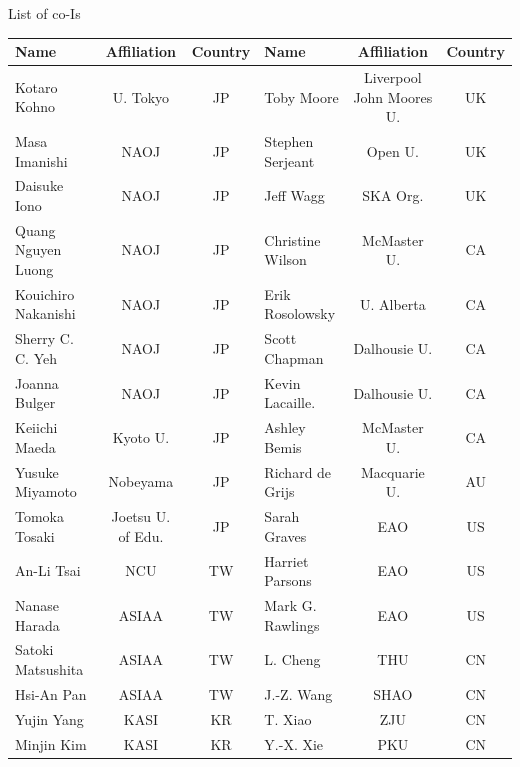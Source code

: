 \documentclass[legal,11pt]{article}
\begin{document}
\begin{table}[htbp]

\centering
{List of co-Is}
\small
\addtolength{\tabcolsep}{-1.pt}

\begin{threeparttable}[b]
\begin{tabular}{lcclcc}
\hline
\hline

Name & Affiliation & Country & Name & Affiliation & Country \\

\hline

Kotaro Kohno         & U. Tokyo          & JP & Toby Moore   & Liverpool John Moores U.  & UK \\  
Masa Imanishi        & NAOJ              & JP & Stephen Serjeant  & Open U.       & UK \\ 
Daisuke Iono         & NAOJ              & JP & Jeff Wagg         & SKA Org.      & UK \\
Quang Nguyen Luong   & NAOJ              & JP & Christine Wilson  & McMaster U.   & CA \\
Kouichiro Nakanishi  & NAOJ              & JP & Erik Rosolowsky   & U. Alberta    & CA \\
Sherry C. C. Yeh     & NAOJ              & JP & Scott Chapman     & Dalhousie U.  & CA \\
Joanna Bulger        & NAOJ              & JP & Kevin Lacaille.   & Dalhousie U.  & CA \\ 
Keiichi Maeda        & Kyoto U.          & JP & Ashley Bemis      & McMaster U.   & CA  \\
Yusuke Miyamoto      & Nobeyama          & JP & Richard de Grijs  & Macquarie U.  & AU \\
Tomoka Tosaki        & Joetsu U. of Edu. & JP & Sarah Graves      & EAO           & US \\
An-Li Tsai           & NCU               & TW & Harriet Parsons   & EAO           & US  \\
Nanase Harada        & ASIAA             & TW & Mark G. Rawlings  & EAO           & US  \\
Satoki Matsushita    & ASIAA             & TW & L. Cheng          & THU           & CN \\ 
Hsi-An Pan           & ASIAA             & TW & J.-Z. Wang        & SHAO          & CN  \\
Yujin Yang           & KASI              & KR & T. Xiao           & ZJU           & CN \\ 
Minjin Kim           & KASI              & KR & Y.-X. Xie         & PKU           & CN \\

\end{tabular}
\end{threeparttable}
\end{table}
\end{document}
